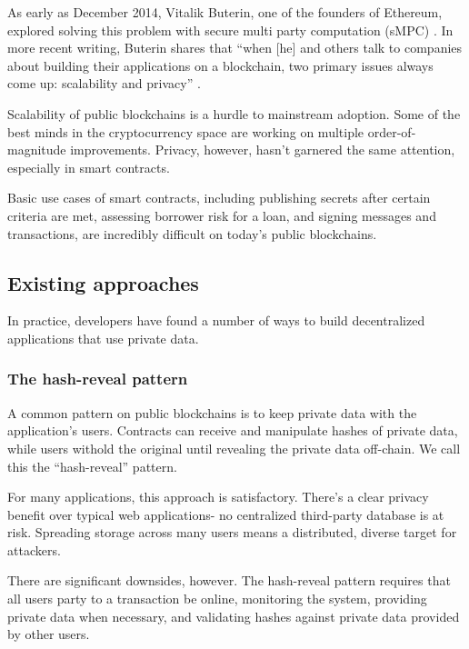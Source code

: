 \documentclass[11pt]{article}
\begin{document}
As early as December 2014, Vitalik Buterin, one of the founders of
Ethereum, explored solving this problem with secure multi party
computation (sMPC) \cite{secretSharingDaos}. In more recent writing,
Buterin shares that ``when [he] and others talk to companies about
building their applications on a blockchain, two primary issues always
come up: scalability and privacy'' \cite{privacyOnTheBlockchain}.

Scalability of public blockchains is a hurdle to mainstream adoption.
Some of the best minds in the cryptocurrency space \cite{lightning}
\cite{ethereumSharding} \cite{plasma} are working on multiple
order-of-magnitude improvements. Privacy, however, hasn't garnered the
same attention, especially in smart contracts.

Basic use cases of smart contracts, including publishing secrets after
certain criteria are met, assessing borrower risk for a loan, and
signing messages and transactions, are incredibly difficult on today's
public blockchains.

\subsection{Existing approaches}

In practice, developers have found a number of ways to build
decentralized applications that use private data.

\subsubsection{The hash-reveal pattern}

A common pattern on public blockchains is to keep private data with
the application's users. Contracts can receive and manipulate hashes
of private data, while users withold the original until revealing
the private data off-chain. We call this the ``hash-reveal'' pattern.

For many applications, this approach is satisfactory. There's a clear
privacy benefit over typical web applications- no centralized
third-party database is at risk. Spreading storage across many users
means a distributed, diverse target for attackers.

There are significant downsides, however. The hash-reveal pattern
requires that all users party to a transaction be online, monitoring
the system, providing private data when necessary, and validating
hashes against private data provided by other users.
\end{document}
